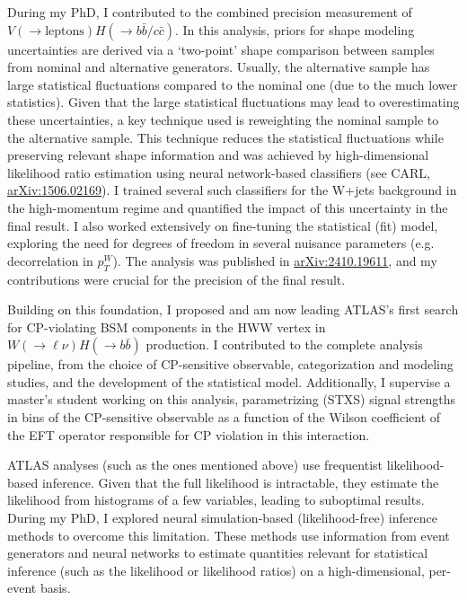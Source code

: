\documentclass[11pt, a4paper]{awesome-cv}
\begin{document}
\begin{cvletter}
  During my PhD, I contributed to the combined precision measurement of $V(\to \textrm{leptons})H(\to b\bar{b}/c\bar{c})$. In this analysis, priors for shape modeling uncertainties are derived via a `two-point' shape comparison between samples from nominal and alternative generators. Usually, the alternative sample has large statistical fluctuations compared to the nominal one (due to the much lower statistics). Given that the large statistical fluctuations may lead to overestimating these uncertainties, a key technique used is reweighting the nominal sample to the alternative sample. This technique reduces the statistical fluctuations while preserving relevant shape information and was achieved by high-dimensional likelihood ratio estimation using neural network-based classifiers (see CARL, \href{https://arxiv.org/abs/1506.02169}{arXiv:1506.02169}). I trained several such classifiers for the W+jets background in the high-momentum regime and quantified the impact of this uncertainty in the final result. I also worked extensively on fine-tuning the statistical (fit) model, exploring the need for degrees of freedom in several nuisance parameters (e.g. decorrelation in $p_T^W$). The analysis was published in \href{https://arxiv.org/abs/2410.19611}{arXiv:2410.19611}, and my contributions were crucial for the precision of the final result.
  
  Building on this foundation, I proposed and am now leading ATLAS's first search for CP-violating BSM components in the HWW vertex in $W(\to \ell \nu)H(\to b\bar{b})$ production. I contributed to the complete analysis pipeline, from the choice of CP-sensitive observable, categorization and modeling studies, and the development of the statistical model. Additionally, I supervise a master's student working on this analysis, parametrizing (STXS) signal strengths in bins of the CP-sensitive observable as a function of the Wilson coefficient of the EFT operator responsible for CP violation in this interaction.
  
  
  ATLAS analyses (such as the ones mentioned above) use frequentist likelihood-based inference. Given that the full likelihood is intractable, they estimate the likelihood from histograms of a few variables, leading to suboptimal results. During my PhD, I explored neural simulation-based (likelihood-free) inference methods to overcome this limitation. These methods use information from event generators and neural networks to estimate quantities relevant for statistical inference (such as the likelihood or likelihood ratios) on a high-dimensional, per-event basis.
  

\end{cvletter}
\end{document}
